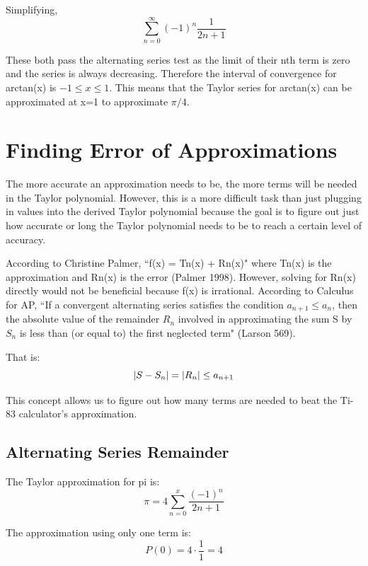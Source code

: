 \documentclass[12pt, titlepage]{article}
\begin{document}
Simplifying,
\begin{equation}
    \sum_{n=0}^{\infty} (-1)^{n} \frac{1}{2n+1}
\end{equation}

These both pass the alternating series test as the limit of their nth term is zero and the series is always decreasing. Therefore the interval of convergence for arctan(x) is \( -1 \leq x \leq 1 \). This means that the Taylor series for arctan(x) can be approximated at x=1 to approximate \(\pi/4\).

\section{Finding Error of Approximations}
The more accurate an approximation needs to be, the more terms will be needed in the Taylor polynomial. However, this is a more difficult task than just plugging in values into the derived Taylor polynomial because the goal is to figure out just how accurate or long the Taylor polynomial needs to be to reach a certain level of accuracy.

According to Christine Palmer, ``f(x) = Tn(x) + Rn(x)" where Tn(x) is the approximation and Rn(x) is the error (Palmer 1998). However, solving for Rn(x) directly would not be beneficial because f(x) is irrational.
According to Calculus for AP, ``If a convergent alternating series satisfies the condition \(a_{n+1} \leq a_{n} \), then the absolute value of the remainder \(R_{n}\) involved in approximating the sum S by \(S_{n}\) is less than (or equal to) the first neglected term" (Larson 569).

That is:
\begin{equation}
  \abs{S - S_{n}} = \abs{R_{n}} \leq a_{n + 1}
\end{equation}

This concept allows us to figure out how many terms are needed to beat the Ti-83 calculator's approximation.

\subsection{Alternating Series Remainder}
The Taylor approximation for pi is:
\begin{equation}
  \pi = 4\sum_{n=0}^{x}{ \frac{(-1)^n}{2n+1}}
\end{equation}

The approximation using only one term is:
\begin{equation}
  P(0) = 4 \cdot \frac{1}{1} = 4
\end{equation}
\end{document}
